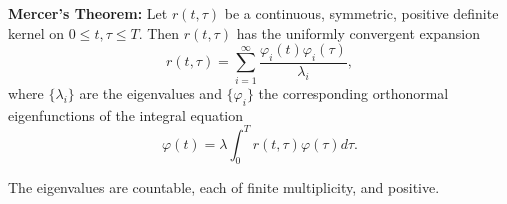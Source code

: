 \textbf{Mercer's Theorem:} Let $r(t, \tau)$ be a continuous, symmetric, positive definite kernel on $0 \leq t, \tau \leq T$. Then $r(t, \tau)$ has the uniformly convergent expansion
$$r(t, \tau) = \sum_{i=1}^{\infty} \frac{\varphi_i(t) \varphi_i(\tau)}{\lambda_i},$$
where $\{\lambda_i\}$ are the eigenvalues and $\{\varphi_i\}$ the corresponding orthonormal eigenfunctions of the integral equation
$$\varphi(t) = \lambda \int_0^T r(t, \tau) \varphi(\tau) d\tau.$$

The eigenvalues are countable, each of finite multiplicity, and positive.
